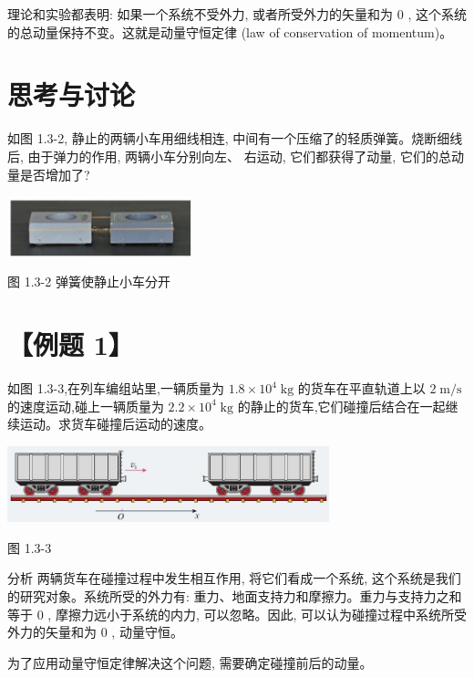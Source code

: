 \documentclass[10pt]{article}
\begin{document}
理论和实验都表明: 如果一个系统不受外力, 或者所受外力的矢量和为 0 , 这个系统的总动量保持不变。这就是动量守恒定律 (law of conservation of momentum)。

\section*{思考与讨论}

如图 1.3-2, 静止的两辆小车用细线相连, 中间有一个压缩了的轻质弹簧。烧断细线后, 由于弹力的作用, 两辆小车分别向左、 右运动, 它们都获得了动量, 它们的总动量是否增加了?

\begin{center}
\includegraphics[max width=0.4\textwidth]{images/01910e4c-ebb8-7d2c-8f2f-2375bc1d2d12_18_708333.jpg}
\end{center}

图 1.3-2 弹簧使静止小车分开

\section*{【例题 1】}

如图 1.3-3,在列车编组站里,一辆质量为 \({1.8} \times {10}^{4}\mathrm{\;{kg}}\) 的货车在平直轨道上以 \(2\mathrm{\;m}/\mathrm{s}\) 的速度运动,碰上一辆质量为 \({2.2} \times {10}^{4}\mathrm{\;{kg}}\) 的静止的货车,它们碰撞后结合在一起继续运动。求货车碰撞后运动的速度。

\begin{center}
\includegraphics[max width=0.7\textwidth]{images/01910e4c-ebb8-7d2c-8f2f-2375bc1d2d12_19_578177.jpg}
\end{center}

图 1.3-3

分析 两辆货车在碰撞过程中发生相互作用, 将它们看成一个系统, 这个系统是我们的研究对象。系统所受的外力有: 重力、地面支持力和摩擦力。重力与支持力之和等于 0 , 摩擦力远小于系统的内力, 可以忽略。因此, 可以认为碰撞过程中系统所受外力的矢量和为 0 , 动量守恒。

为了应用动量守恒定律解决这个问题, 需要确定碰撞前后的动量。
\end{document}

